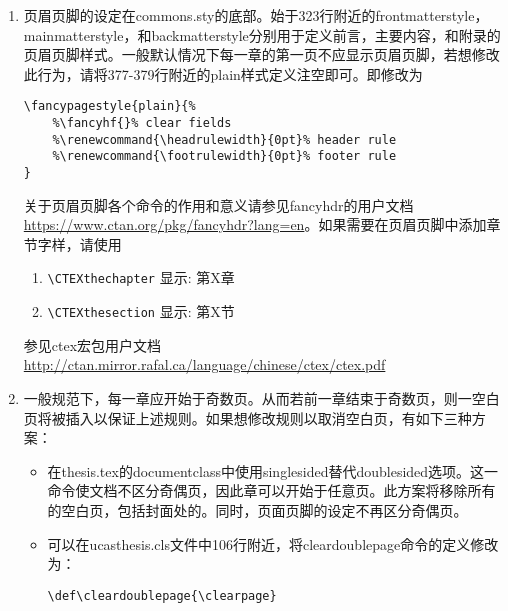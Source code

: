 \begin{enumerate}
      在Thesis.tex中设置启用adobe的字体:

      \verb+\documentclass[doublesided,fontset=adobe]{Style/ucasthesis}%+

      如果\LaTeX{}软件版本比较老旧，如Linux用户，ctex宏包没有更新，设置启用adobe的字体则为:

      \verb+\documentclass[doublesided,adobefonts]{Style/ucasthesis}%+
     
     最后选择xelatex编译引擎编译。

     因为模版的设定考虑兼顾不同操作系统(Windows, Linux, Mac OS)并兼顾pdflatex和xelatex，为了模版的健壮性，上述方案并未作为原始设定。
 \item 页眉页脚的设定在commons.sty的底部。始于323行附近的frontmatterstyle，mainmatterstyle，和backmatterstyle分别用于定义前言，主要内容，和附录的页眉页脚样式。一般默认情况下每一章的第一页不应显示页眉页脚，若想修改此行为，请将377-379行附近的plain样式定义注空即可。即修改为

\begin{verbatim}
\fancypagestyle{plain}{%
    %\fancyhf{}% clear fields
    %\renewcommand{\headrulewidth}{0pt}% header rule
    %\renewcommand{\footrulewidth}{0pt}% footer rule
}
\end{verbatim}
     
     关于页眉页脚各个命令的作用和意义请参见fancyhdr的用户文档 \url{https://www.ctan.org/pkg/fancyhdr?lang=en}。如果需要在页眉页脚中添加章节字样，请使用
      \begin{enumerate}
          \item \verb+\CTEXthechapter+  显示: 第X章
          \item \verb+\CTEXthesection+  显示: 第X节
      \end{enumerate}
      参见ctex宏包用户文档 \url{http://ctan.mirror.rafal.ca/language/chinese/ctex/ctex.pdf}
  \item 一般规范下，每一章应开始于奇数页。从而若前一章结束于奇数页，则一空白页将被插入以保证上述规则。如果想修改规则以取消空白页，有如下三种方案：
\begin{itemize}
    \item 在thesis.tex的documentclass中使用singlesided替代doublesided选项。这一命令使文档不区分奇偶页，因此章可以开始于任意页。此方案将移除所有的空白页，包括封面处的。同时，页面页脚的设定不再区分奇偶页。
    \item 可以在ucasthesis.cls文件中106行附近，将cleardoublepage命令的定义修改为：

      \verb|\def\cleardoublepage{\clearpage}|


\end{itemize}
\end{enumerate}
